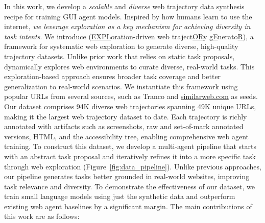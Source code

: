 In this work, we develop a \textit{scalable} and \textit{diverse} web trajectory data synthesis recipe for training GUI agent models.
Inspired by how humans learn to use the internet, \textit{we leverage exploration as a key mechanism for achieving diversity in task intents}.
We introduce \textbf{\model} (\underline{EXPL}oration-driven web traject\underline{OR}y g\underline{E}nerato\underline{R}), a framework for systematic web exploration to generate diverse, high-quality trajectory datasets.
Unlike prior work that relies on static task proposals, \model dynamically explores web environments to curate diverse, real-world tasks.
This exploration-based approach ensures broader task coverage and better generalization to real-world scenarios.
We instantiate this framework using popular URLs from several sources, such as Tranco \cite{DBLP:conf/ndss/PochatGTKJ19} and \url{similarweb.com} as seeds.
Our dataset comprises 94K diverse web trajectories spanning 49K unique URLs, making it the largest web trajectory dataset to date.
Each trajectory is richly annotated with artifacts such as screenshots, raw and set-of-mark \cite{yang2023set} annotated versions, HTML, and the accessibility tree, enabling comprehensive web agent training.
To construct this dataset, we develop a multi-agent pipeline that starts with an abstract task proposal and iteratively refines it into a more specific task through web exploration (Figure~\ref{fig:data_pipeline}).
Unlike previous approaches, our pipeline generates tasks better grounded in real-world websites, improving task relevance and diversity.
To demonstrate the effectiveness of our dataset, we train small language models using just the synthetic data and outperform existing web agent baselines by a significant margin.
The main contributions of this work are as follows:
